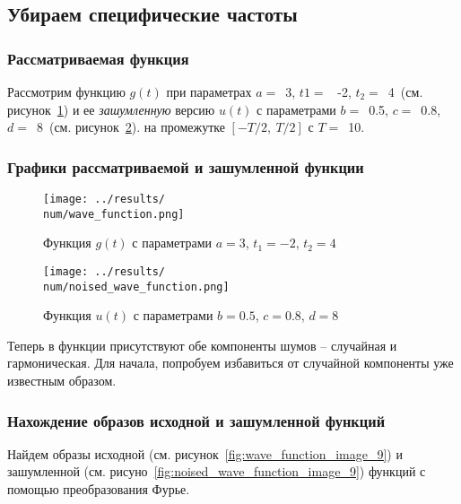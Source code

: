 \subsection{Убираем специфические частоты}

\def\num{9}
\def\a{3}
\def\from{-2}
\def\to{4}
\def\b{0.5}
\def\c{0.8}
\def\d{8}
\def\T{10}
\def\imageclip{15}

\subsubsection{Рассматриваемая функция} 

Рассмотрим функцию $g(t)$ при параметрах $a=$~\a, $t1 =$~ \from, $t_2 =$~\to ~(см. рисунок~\ref{fig:wave_function_\num}) 
и ее \textit{зашумленную} версию $u(t)$ с параметрами $b =$~\b, $c =$~\c, $d =$~\d ~(см. рисунок~\ref{fig:noised_wave_function_\num}).
на промежутке $[-T/2,~T/2]$ с $T =$~\T.

\FloatBarrier
\subsubsection{Графики рассматриваемой и зашумленной функции}
\begin{figure}[ht!]
    \centering
    \texttt{[image: ../results/\\num/wave\_function.png]}
    \caption{Функция $g(t)$ с параметрами $a = \a$, $t_1 = \from$, $t_2 = \to$}
    \label{fig:wave_function_\num}
\end{figure}

\begin{figure}[ht!]
    \centering
    \texttt{[image: ../results/\\num/noised\_wave\_function.png]}
    \caption{Функция $u(t)$ с параметрами $b = \b$, $c = \c$, $d = \d$}
    \label{fig:noised_wave_function_\num}
\end{figure}

Теперь в функции присутствуют обе компоненты шумов -- случайная и гармоническая. Для начала, попробуем избавиться от случайной компоненты уже известным образом. 

\FloatBarrier
\subsubsection{Нахождение образов исходной и зашумленной функций}
Найдем образы исходной (см. рисунок~\ref{fig:wave_function_image_\num}) 
и зашумленной (см. рисуно~\ref{fig:noised_wave_function_image_\num}) функций с помощью преобразования Фурье. 

